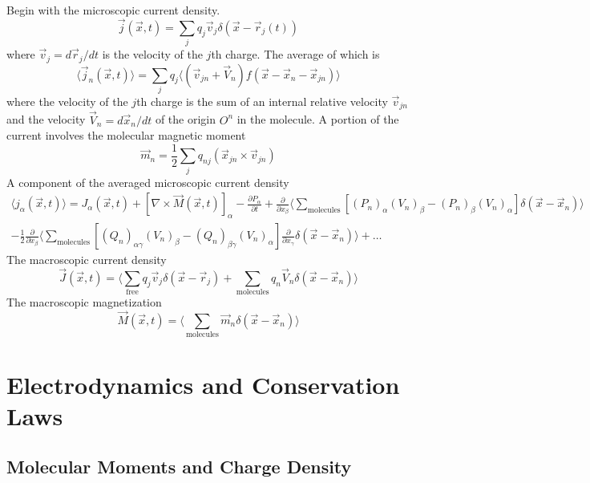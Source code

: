 \documentclass{article}
\begin{document}
	Begin with the microscopic current density.
	\begin{equation}
		\vec{j}(\vec{x},t) = \sum_j q_j \vec{v}_j \delta(\vec{x}-\vec{r}_j(t))
	\end{equation}
	where $\vec{v}_j = d\vec{r}_j/dt$ is the velocity of the $j$th charge.
	The average of which is
	\begin{equation}
		\langle \vec{j}_n(\vec{x},t) \rangle = \sum_j q_j \langle (\vec{v}_{jn}+\vec{V}_n) f(\vec{x}-\vec{x}_n-\vec{x}_{jn}) \rangle
	\end{equation}
	where the velocity of the $j$th charge is the sum of an internal relative velocity $\vec{v}_{jn}$ and the velocity $\vec{V}_n = d\vec{x}_n/dt$ of the origin $O^n$ in the molecule.
	A portion of the current involves the molecular magnetic moment
	\begin{equation}
		\vec{m}_n = \frac{1}{2}\sum_j q_{nj} (\vec{x}_{jn} \times \vec{v}_{jn})
	\end{equation}
	A component of the averaged microscopic current density
	\begin{multline}
		\langle j_\alpha(\vec{x},t) \rangle = J_\alpha(\vec{x},t) + [\nabla \times \vec{M}(\vec{x},t)]_\alpha - \frac{\partial P_\alpha}{\partial t} + \frac{\partial}{\partial x_\beta} \langle \sum_{\text{molecules}} [(P_n)_\alpha (V_n)_\beta - (P_n)_\beta (V_n)_\alpha] \delta(\vec{x}-\vec{x}_n) \rangle \\
		- \frac{1}{2} \frac{\partial}{\partial x_\beta} \langle \sum_{\text{molecules}} [(Q_n)_{\alpha\gamma}(V_n)_\beta - (Q_n)_{\beta\gamma}(V_n)_\alpha] \frac{\partial}{\partial x_\gamma} \delta(\vec{x}-\vec{x}_n) \rangle + \dots
	\end{multline}
	The macroscopic current density
	\begin{equation}
		\vec{J}(\vec{x},t) = \langle \sum_{\text{free}} q_j \vec{v}_j \delta(\vec{x}-\vec{r}_j) + \sum_{\text{molecules}} q_n \vec{V}_n \delta(\vec{x}-\vec{x}_n) \rangle
	\end{equation}
	The macroscopic magnetization
	\begin{equation}
		\vec{M}(\vec{x},t) = \langle \sum_{\text{molecules}} \vec{m}_n \delta(\vec{x}-\vec{x}_n) \rangle
	\end{equation}
	\section*{Electrodynamics and Conservation Laws}
	
	\subsection*{Molecular Moments and Charge Density}
	
\end{document}
